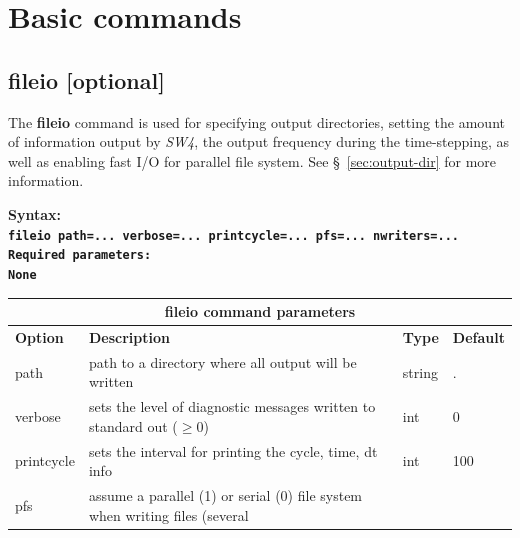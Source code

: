\documentclass[11pt]{report}
\begin{document}
{%
\section{Basic commands}

\subsection{fileio [optional]}
The {\bf fileio} command is used for specifying output directories, setting the amount of
information output by \emph{SW4}, the output frequency during the time-stepping, as well
as enabling fast I/O for parallel file system. See \S~\ref{sec:output-dir} for more information.
\begin{flushleft}\bf
	Syntax:\\ \tt fileio path=... verbose=... printcycle=... pfs=... nwriters=... \\
	\bf Required parameters:\\
	\rm None
\end{flushleft}
\begin{center}
	\begin{tabular}{|l|p{8cm}|l|l|} \hline
		\multicolumn{4}{|c|}{\bf fileio command parameters}                                                                                                                                  \\ \hline
		\bf{Option}                                                                 & \bf{Description}                                                            & \bf{Type} & \bf{Default} \\ \hline \hline
		path                                                                        & path to a directory where all output will be written                        & string    & .            \\ \hline
		verbose                                                                     & sets the level of diagnostic messages written to standard out ($\geq 0$)    & int       & 0            \\ \hline
		printcycle                                                                  & sets the interval for printing the cycle, time, dt info                     & int       & 100          \\ \hline
		pfs                                                                         & assume a parallel (1) or serial (0) file system when writing files (several

\end{tabular}
\end{center}}
\end{document}
